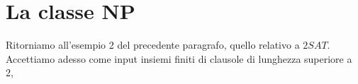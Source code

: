 \section{La classe NP}

Ritorniamo all'esempio 2 del precedente paragrafo, quello relativo a $2 S A T$.
Accettiamo adesso come input insiemi finiti di clausole di lunghezza superiore a
2,
